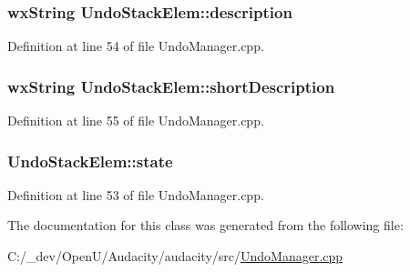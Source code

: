 \subsubsection[{\texorpdfstring{description}{description}}]{\setlength{\rightskip}{0pt plus 5cm}wx\+String Undo\+Stack\+Elem\+::description}\hypertarget{struct_undo_stack_elem_ad82310a016e4a9679ab6d0b4fe58e3bf}{}\label{struct_undo_stack_elem_ad82310a016e4a9679ab6d0b4fe58e3bf}


Definition at line 54 of file Undo\+Manager.\+cpp.

\subsubsection[{\texorpdfstring{short\+Description}{shortDescription}}]{\setlength{\rightskip}{0pt plus 5cm}wx\+String Undo\+Stack\+Elem\+::short\+Description}\hypertarget{struct_undo_stack_elem_aaaed774e0eff7f874640d2d8ace36d92}{}\label{struct_undo_stack_elem_aaaed774e0eff7f874640d2d8ace36d92}


Definition at line 55 of file Undo\+Manager.\+cpp.

\subsubsection[{\texorpdfstring{state}{state}}]{ Undo\+Stack\+Elem\+::state}\hypertarget{struct_undo_stack_elem_ac925900ef2b454cf99b170b16305cdbd}{}\label{struct_undo_stack_elem_ac925900ef2b454cf99b170b16305cdbd}


Definition at line 53 of file Undo\+Manager.\+cpp.



The documentation for this class was generated from the following file\+:\begin{DoxyCompactItemize}
\item 
C\+:/\+\_\+dev/\+Open\+U/\+Audacity/audacity/src/\hyperlink{_undo_manager_8cpp}{Undo\+Manager.\+cpp}\end{DoxyCompactItemize}
